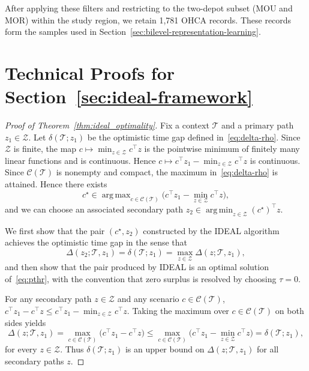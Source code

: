 \documentclass[11pt, letterpaper, oneside, reqno]{amsart}
\DeclareMathOperator*{\argmin}{arg\,min}
\DeclareMathOperator*{\argmax}{arg\,max}
\newcommand{\opt}{^\star}
\begin{document}
After applying these filters and restricting to the two-depot subset (MOU and MOR) within the study region, we retain 1{,}781 OHCA records. These records form the samples used in Section~\ref{sec:bilevel-representation-learning}.


\section{Technical Proofs for Section~\ref{sec:ideal-framework}}\label{ec:proofs-ideal-framework}
\begin{proof}[Proof of Theorem~\ref{thm:ideal_optimality}]
Fix a context $\mathcal T$ and a primary path $z_1 \in \mathcal Z$. Let $\delta(\mathcal T; z_1)$ be the optimistic time gap defined in~\eqref{eq:delta-rho}. Since $\mathcal Z$ is finite, the map $c\mapsto \min_{z\in\mathcal Z}c^\top z$ is the pointwise minimum of finitely many linear functions and is continuous. Hence $c\mapsto c^\top z_1-\min_{z\in\mathcal Z}c^\top z$ is continuous. Since $\mathcal C(\mathcal T)$ is nonempty and compact, the maximum in~\eqref{eq:delta-rho} is attained. Hence there exists
\[
c\opt \in \argmax_{c\in\mathcal C(\mathcal T)}
\bigl(c^\top z_1 - \min_{z\in\mathcal Z} c^\top z\bigr),
\]
and we can choose an associated secondary path $z_2 \in \argmin_{z\in\mathcal Z} (c\opt)^\top z$.

We first show that the pair $(c\opt,z_2)$ constructed by the IDEAL algorithm achieves the optimistic time gap in the sense that
\begin{equation}
\label{eq:delta-equals-Delta-max}
\Delta(z_2;\mathcal T,z_1) = \delta(\mathcal T; z_1)
= \max_{z\in\mathcal Z} \Delta(z;\mathcal T,z_1),
\end{equation}
and then show that the pair produced by IDEAL is an optimal solution of~\eqref{eq:pthr}, with the convention that zero surplus is resolved by choosing $\tau=0$.

For any secondary path $z\in\mathcal Z$ and any scenario $c\in\mathcal C(\mathcal T)$,
$c^\top z_1 - c^\top z \le c^\top z_1 - \min_{z\in\mathcal Z} c^\top z$. Taking the maximum over $c\in\mathcal C(\mathcal T)$ on both sides yields
\[
\Delta(z;\mathcal T,z_1)
= \max_{c\in\mathcal C(\mathcal T)} \bigl(c^\top z_1 - c^\top z\bigr)
\le
\max_{c\in\mathcal C(\mathcal T)}\bigl(c^\top z_1 - \min_{z\in\mathcal Z} c^\top z\bigr)
= \delta(\mathcal T; z_1),
\]
for every $z\in\mathcal Z$. Thus $\delta(\mathcal T; z_1)$ is an upper bound on $\Delta(z;\mathcal T,z_1)$ for all secondary paths $z$.


\end{proof}
\end{document}
